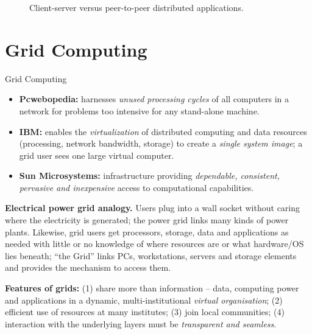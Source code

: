 \begin{figure}[H]
\centering
{}
\caption{Client-server versus peer-to-peer distributed applications.}
\end{figure}

\section{Grid Computing}
\begin{defbox}{Grid Computing}
\begin{itemize}[leftmargin=*]
  \item \textbf{Pcwebopedia:} harnesses \emph{unused processing cycles} of all computers in a
        network for problems too intensive for any stand-alone machine.
  \item \textbf{IBM:} enables the \emph{virtualization} of distributed computing and data
        resources (processing, network bandwidth, storage) to create a \emph{single system
        image}; a grid user sees one large virtual computer.
  \item \textbf{Sun Microsystems:} infrastructure providing \emph{dependable, consistent,
        pervasive and inexpensive} access to computational capabilities.
\end{itemize}
\end{defbox}

\textbf{Electrical power grid analogy.} Users plug into a wall socket without caring where the
electricity is generated; the power grid links many kinds of power plants. Likewise, grid users
get processors, storage, data and applications as needed with little or no knowledge of where
resources are or what hardware/OS lies beneath; ``the Grid'' links PCs, workstations, servers and
storage elements and provides the mechanism to access them.

\textbf{Features of grids:} (1) share more than information -- data, computing power and
applications in a dynamic, multi-institutional \emph{virtual organisation}; (2) efficient use of
resources at many institutes; (3) join local communities; (4) interaction with the underlying
layers must be \emph{transparent and seamless}.

